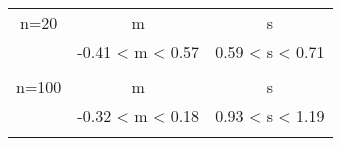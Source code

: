 \begin{table}[H]
\centering
\begin{tabular}{c|c|c}
        n=20 & m & s \\
         & -0.41 < m < 0.57 & 0.59 < s < 0.71 \\
        \hline
        \multicolumn{3}{c}{} \\
        n=100 & m & s \\
         & -0.32 < m < 0.18 & 0.93 < s < 1.19 \\
        \hline
        \multicolumn{3}{c}{} \\
    \end{tabular}
    \caption{}
    \label{}
\end{table}
